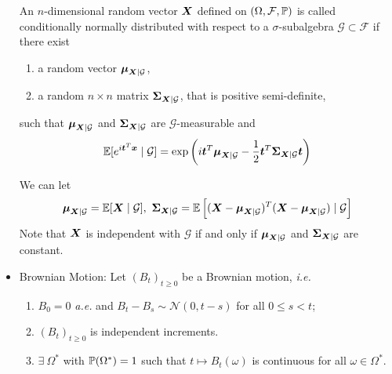 \documentclass[a4paper,12pt]{article}
\begin{document}
\begin{itemize}
  \noindent An $n$-dimensional random vector $\boldsymbol{X}$ defined on $(\Omega, \mathcal{F}, \mathbb{P})$ is called conditionally normally distributed with respect to a $\sigma$-subalgebra $\mathcal{G} \subset \mathcal{F}$ if there exist
  \begin{enumerate}[label=(\Roman*)]
    \item a random vector $\boldsymbol{\mu}_{\boldsymbol{X}|\mathcal{G}}$,
    \item a random $n \times n$ matrix $\boldsymbol{\Sigma}_{\boldsymbol{X}|\mathcal{G}}$, that is positive semi-definite,
  \end{enumerate}
  such that $\boldsymbol{\mu}_{\boldsymbol{X}|\mathcal{G}}$ and $\boldsymbol{\Sigma}_{\boldsymbol{X}|\mathcal{G}}$ are $\mathcal{G}$-measurable and 
  \begin{equation*}
    \mathbb{E}[e^{i\boldsymbol{t}^T\boldsymbol{x}} \mid \mathcal{G}] = \exp\left(i\boldsymbol{t}^T\boldsymbol{\mu}_{\boldsymbol{X}|\mathcal{G}} - \frac{1}{2}\boldsymbol{t}^T\boldsymbol{\Sigma}_{\boldsymbol{X}|\mathcal{G}}\boldsymbol{t}\right)
  \end{equation*}
  \begin{rmk}
    We can let
    \begin{equation*}
      \boldsymbol{\mu}_{\boldsymbol{X}|\mathcal{G}} = \mathbb{E}[\boldsymbol{X} \mid \mathcal{G}],~\boldsymbol{\Sigma}_{\boldsymbol{X}|\mathcal{G}} =  \mathbb{E} \left[(\boldsymbol{X}-\boldsymbol{\mu}_{\boldsymbol{X}|\mathcal{G}})^T(\boldsymbol{X}-\boldsymbol{\mu}_{\boldsymbol{X}|\mathcal{G}}) \mid \mathcal{G}\right]
    \end{equation*}
    Note that $\boldsymbol{X}$ is independent with $\mathcal{G}$ if and only if $\boldsymbol{\mu}_{\boldsymbol{X}|\mathcal{G}}$ and $\boldsymbol{\Sigma}_{\boldsymbol{X}|\mathcal{G}}$ are constant.
  \end{rmk}

  \item Brownian Motion: Let $(B_t)_{t \geqslant 0}$ be a Brownian motion, \emph{i.e.}
  \begin{enumerate}[label=(\arabic*)]
    \item $B_0 = 0$ \emph{a.e.} and $B_t -B_s \sim \mathcal{N}(0, t-s)$ for all $0\leqslant s < t$;
    \item $(B_t)_{t \geqslant 0}$ is independent increments.
    \item $\exists~\Omega^*$ with $\mathbb{P}(\Omega^*)=1$ such that $t \mapsto B_t(\omega)$ is continuous for all $\omega \in \Omega^*$.
  \end{enumerate}


\end{itemize}
\end{document}
